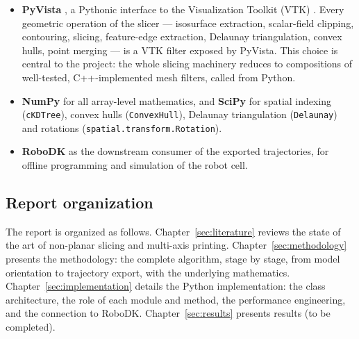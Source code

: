 \begin{itemize}
  \item \textbf{PyVista} \cite{pyvista}, a Pythonic interface to the
        Visualization Toolkit (VTK) \cite{vtk}. Every geometric
        operation of the slicer --- isosurface extraction, scalar-field
        clipping, contouring, slicing, feature-edge extraction, Delaunay
        triangulation, convex hulls, point merging --- is a VTK filter
        exposed by PyVista. This choice is central to the project: the
        whole slicing machinery reduces to compositions of
        well-tested, C++-implemented mesh filters, called from Python.
  \item \textbf{NumPy} for all array-level mathematics, and
        \textbf{SciPy} \cite{scipy} for spatial indexing
        (\texttt{cKDTree}), convex hulls (\texttt{ConvexHull}), Delaunay
        triangulation (\texttt{Delaunay}) and rotations
        (\texttt{spatial.transform.Rotation}).
  \item \textbf{RoboDK} \cite{robodk} as the downstream consumer of the
        exported trajectories, for offline programming and simulation of
        the robot cell.
\end{itemize}

\subsection{Report organization}

The report is organized as follows.
Chapter~\ref{sec:literature} reviews the state of the art of non-planar
slicing and multi-axis printing. Chapter~\ref{sec:methodology} presents
the methodology: the complete algorithm, stage by stage, from model
orientation to trajectory export, with the underlying mathematics.
Chapter~\ref{sec:implementation} details the Python implementation:
the class architecture, the role of each module and method, the
performance engineering, and the connection to RoboDK.
Chapter~\ref{sec:results} presents results (to be completed).
